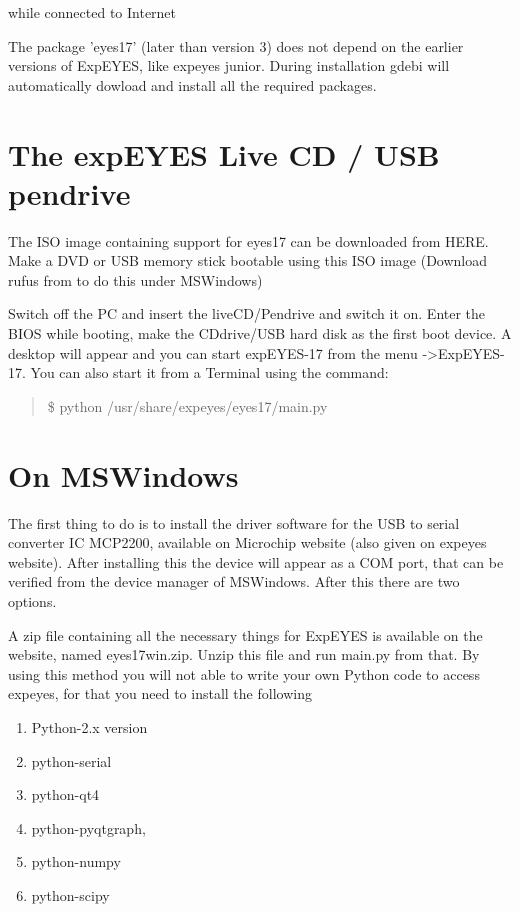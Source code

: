\documentclass[a4paper,12pt,english]{sphinxmanual}
\begin{document}
while connected to Internet

The package ’eyes17’ (later than version 3) does not depend on the
earlier versions of ExpEYES, like expeyes junior. During installation
gdebi will automatically dowload and install all the required packages.


\section{The expEYES Live CD / USB pendrive}
\label{\detokenize{1.3:the-expeyes-live-cd-usb-pendrive}}
The ISO image containing support for eyes17 can be downloaded from HERE.
Make a DVD or USB memory stick bootable using this ISO image (Download
rufus from  to do this under MSWindows)

Switch off the PC and insert the liveCD/Pendrive and switch it on. Enter
the BIOS while booting, make the CDdrive/USB hard disk as the first boot
device. A desktop will appear and you can start expEYES-17 from the menu
-\textgreater{}ExpEYES-17. You can also start it from a
Terminal using the command:
\begin{quote}

\$ python /usr/share/expeyes/eyes17/main.py
\end{quote}


\section{On MSWindows}
\label{\detokenize{1.3:on-mswindows}}
The first thing to do is to install the driver software for the USB to
serial converter IC MCP2200, available on Microchip website (also given
on expeyes website). After installing this the device will appear as a
COM port, that can be verified from the device manager of MSWindows.
After this there are two options.

A zip file containing all the necessary things for ExpEYES is available
on the website, named eyes17win.zip. Unzip this file and run main.py
from that. By using this method you will not able to write your own
Python code to access expeyes, for that you need to install the
following
\begin{enumerate}
\def\theenumi{\arabic{enumi}}
\def\labelenumi{\theenumi .}
\makeatletter\def\p@enumii{\p@enumi \theenumi .}\makeatother
\item {} 
Python-2.x version

\item {} 
python-serial

\item {} 
python-qt4

\item {} 
python-pyqtgraph,

\item {} 
python-numpy

\item {} 
python-scipy

\end{enumerate}
\end{document}
